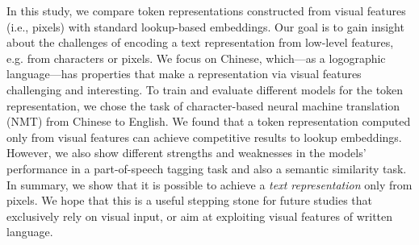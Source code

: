 In this study, we compare token representations constructed from visual features (i.e., pixels) with standard lookup-based embeddings. Our goal is to gain insight about the challenges of encoding a text representation from low-level features, e.g. from characters or pixels. We focus on Chinese, which---as a logographic language---has properties that make a representation via visual features challenging and interesting. To train and evaluate different models for the token representation, we chose the task of character-based neural machine translation (NMT) from Chinese to English. We found that a token representation computed only from visual features can achieve competitive results to lookup embeddings. However, we also show different strengths and weaknesses in the models' performance in a part-of-speech tagging task and also a semantic similarity task. In summary, we show that it is possible to achieve a \textit{text representation} only from pixels. We hope that this is a useful stepping stone for future studies that exclusively rely on visual input, or aim at exploiting visual features of written language.
